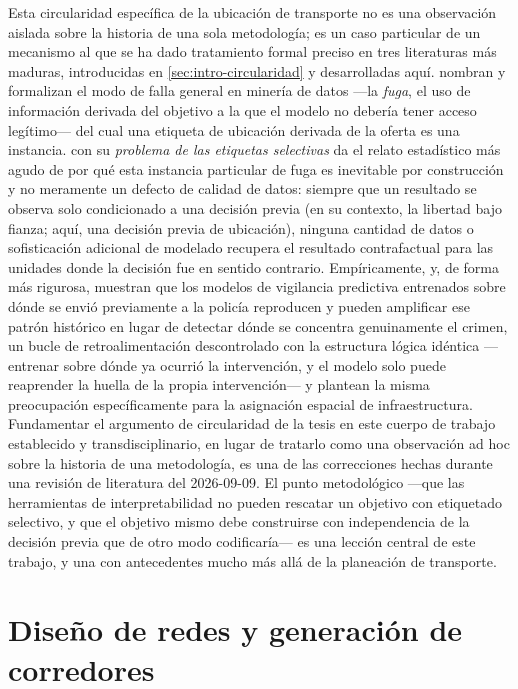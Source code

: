 Esta circularidad específica de la ubicación de transporte no es una observación aislada
sobre la historia de una sola metodología; es un caso particular de un mecanismo al que se
ha dado tratamiento formal preciso en tres literaturas más maduras, introducidas en
\cref{sec:intro-circularidad} y desarrolladas aquí. \textcite{kaufman2012leakage} nombran y
formalizan el modo de falla general en minería de datos ---la \emph{fuga}, el uso de
información derivada del objetivo a la que el modelo no debería tener acceso legítimo---
del cual una etiqueta de ubicación derivada de la oferta es una instancia.
\textcite{lakkaraju2017selectivelabels} con su \emph{problema de las etiquetas selectivas}
da el relato estadístico más agudo de por qué esta instancia particular de fuga es
inevitable por construcción y no meramente un defecto de calidad de datos: siempre que un
resultado se observa solo condicionado a una decisión previa (en su contexto, la libertad
bajo fianza; aquí, una decisión previa de ubicación), ninguna cantidad de datos o
sofisticación adicional de modelado recupera el resultado contrafactual para las unidades
donde la decisión fue en sentido contrario. Empíricamente, \textcite{lum2016predict} y, de
forma más rigurosa, \textcite{ensign2018runaway} muestran que los modelos de vigilancia
predictiva entrenados sobre dónde se envió previamente a la policía reproducen y pueden
amplificar ese patrón histórico en lugar de detectar dónde se concentra genuinamente el
crimen, un bucle de retroalimentación descontrolado con la estructura lógica idéntica
---entrenar sobre dónde ya ocurrió la intervención, y el modelo solo puede reaprender la
huella de la propia intervención--- y \textcite{flynn2022spacetime} plantean la misma
preocupación específicamente para la asignación espacial de infraestructura. Fundamentar el
argumento de circularidad de la tesis en este cuerpo de trabajo establecido y
transdisciplinario, en lugar de tratarlo como una observación ad hoc sobre la historia de
una metodología, es una de las correcciones hechas durante una revisión de literatura del
2026-09-09. El punto metodológico ---que las herramientas de interpretabilidad no pueden
rescatar un objetivo con etiquetado selectivo, y que el objetivo mismo debe construirse con
independencia de la decisión previa que de otro modo codificaría--- es una lección central
de este trabajo, y una con antecedentes mucho más allá de la planeación de transporte.

\section{Diseño de redes y generación de corredores}
\label{sec:marco-redes}

